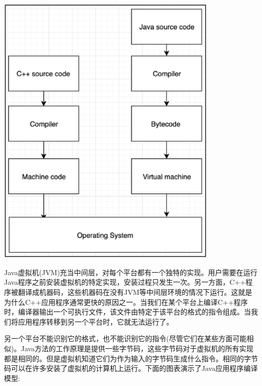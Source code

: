 \begin{center}
	\includegraphics[width=0.8\textwidth]{content/Section-2/Chapter-14/1}
\end{center}

Java虚拟机(JVM)充当中间层，对每个平台都有一个独特的实现。用户需要在运行Java程序之前安装虚拟机的特定实现，安装过程只发生一次。另一方面，C++程序被翻译成机器码，这些机器码在没有JVM等中间层环境的情况下运行。这就是为什么C++应用程序通常更快的原因之一。当我们在某个平台上编译C++程序时，编译器输出一个可执行文件，该文件由特定于该平台的格式的指令组成。当我们将应用程序转移到另一个平台时，它就无法运行了。 \par
另一个平台不能识别它的格式，也不能识别它的指令(尽管它们在某些方面可能相似)。Java方法的工作原理是提供一些字节码，这些字节码对于虚拟机的所有实现都是相同的。但是虚拟机知道它们为作为输入的字节码生成什么指令。相同的字节码可以在许多安装了虚拟机的计算机上运行。下面的图表演示了Java应用程序编译模型: \par

